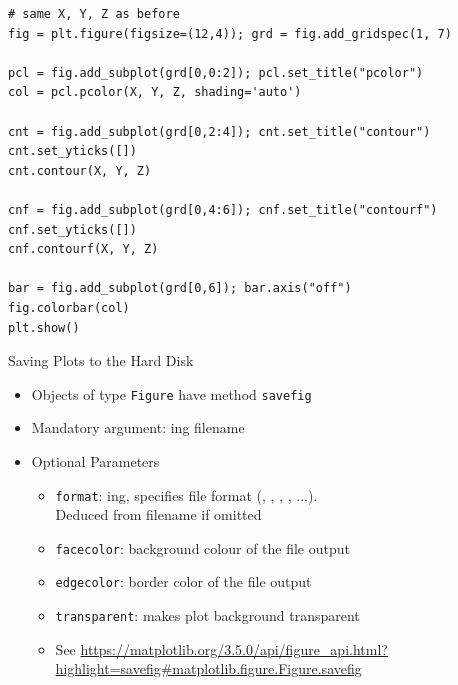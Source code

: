 
\begin{frame}[fragile]
%
\begin{codebox}
\begin{verbatim}
# same X, Y, Z as before
fig = plt.figure(figsize=(12,4)); grd = fig.add_gridspec(1, 7)

pcl = fig.add_subplot(grd[0,0:2]); pcl.set_title("pcolor")
col = pcl.pcolor(X, Y, Z, shading='auto')

cnt = fig.add_subplot(grd[0,2:4]); cnt.set_title("contour")
cnt.set_yticks([])
cnt.contour(X, Y, Z)

cnf = fig.add_subplot(grd[0,4:6]); cnf.set_title("contourf")
cnf.set_yticks([])
cnf.contourf(X, Y, Z)

bar = fig.add_subplot(grd[0,6]); bar.axis("off")
fig.colorbar(col)
plt.show()
\end{verbatim}
\end{codebox}
%
\end{frame}


\begin{frame}[fragile]{Saving Plots to the Hard Disk}
%
\begin{itemize}
\item Objects of type \texttt{Figure} have method \texttt{savefig}
\item Mandatory argument: ing filename
\item Optional Parameters
	\begin{itemize}
	\item \texttt{format}: ing, specifies file format (\eg {}, , , , ...).\\
		Deduced from filename if omitted
	\item \texttt{facecolor}: background colour of the file output
	\item \texttt{edgecolor}: border color of the file output
	\item \texttt{transparent}:  makes plot background transparent
	\item See \url{https://matplotlib.org/3.5.0/api/figure_api.html?highlight=savefig#matplotlib.figure.Figure.savefig}
	\end{itemize}
\end{itemize}
%
\end{frame}